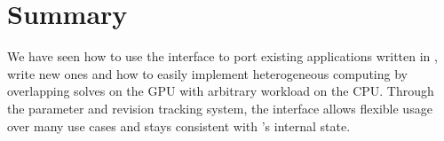 





\section{Summary}

We have seen how to use the interface to port existing applications written in \openqxd, write new ones and how to easily implement heterogeneous computing by overlapping solves on the GPU with arbitrary workload on the CPU.
Through the parameter and revision tracking system, the interface allows flexible usage over many use cases and stays consistent with \openqxd's internal state.


